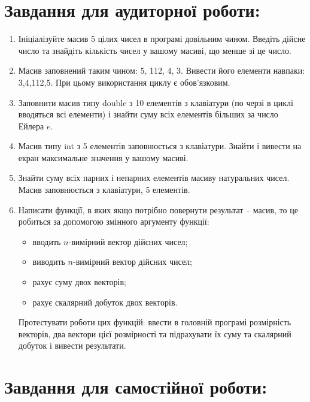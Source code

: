 \documentclass[a5paper,titlepage,openany,twoside,
]
{book_unv}%
\begin{document}
\section{Завдання для аудиторної роботи:}

\begin{enumerate}
\def\labelenumi{\arabic{enumi})}
\item
  Ініціалізуйте масив 5 цілих чисел в програмі довільним чином. Введіть
  дійсне число та знайдіть кількість чисел у вашому масиві, що менше зі
  це число.

\item
  Масив заповнений таким чином: 5, 112, 4, 3. Вивести його елементи
  навпаки: 3,4,112,5. При цьому використання циклу є обов'язковим.
\item
  Заповнити масив типу double з 10 елементів з клавіатури (по черзі в
  циклі вводяться всі елементи) і знайти суму всіх елементів більших за
  число Ейлера \(e\).
\item
  Масив типу int з 5 елементів заповнюється з клавіатури. Знайти і
  вивести на екран максимальне значення у вашому масиві.
\item
  Знайти суму всіх парних і непарних елементів масиву натуральних чисел.
  Масив заповнюється з клавіатури, 5 елементів.
\item
Написати функції, в яких якщо потрібно повернути результат -- масив,
то це робиться за допомогою змінного аргументу функції:
\begin{itemize}
\item вводить $n$-вимірний вектор дійсних чисел;
\item виводить $n$-вимірний вектор дійсних чисел;
\item рахує суму двох векторів;
\item рахує скалярний добуток двох векторів.
 \end{itemize}
Протестувати роботи цих функцій: ввести в головній програмі розмірність
векторів, два вектори цієї розмірності та підрахувати їх суму та скалярний
добуток і вивести результати.
\end{enumerate}

\section{Завдання для самостійної роботи:}
\end{document}
